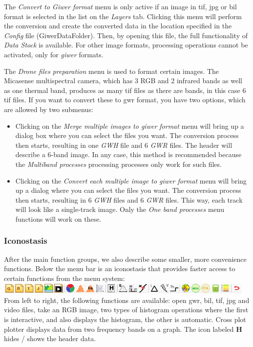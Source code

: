 \documentclass[a4paper,12pt]{article}
\begin{document}
The \textit {Convert to Giwer format} menu is only active if an image in tif, jpg or bil format is selected in the list on the \textit {Layers} tab. Clicking this menu will perform the conversion and create the converted data in the location specified in the \textit {Config} file (GiwerDataFolder). Then, by opening this file, the full functionality of \textit {Data Stock} is available. For other image formats, processing operations cannot be activated, only for \textit {giwer} formats.

The \textit {Drone files preparation} menu is used to format certain images. The Micasense multispectral camera, which has 3 RGB and 2 infrared bands as well as one thermal band, produces as many tif files as there are bands, in this case 6 tif files. If you want to convert these to gwr format, you have two options, which are allowed by two submenus: 

\begin{itemize}
	\item Clicking on the \textit {Merge multiple images to giwer format} menu will bring up a dialog box where you can select the files you want. The conversion process then starts, resulting in one \textit {GWH} file and 6 \textit {GWR} files. The header will describe a 6-band image. In any case, this method is recommended because the \textit {Multiband processes} processing processes only work for such files. 
	
	\item Clicking on the \textit {Convert each multiple image to giwer format} menu will bring up a dialog where you can select the files you want. The conversion process then starts, resulting in 6 \textit {GWH} files and 6 \textit {GWR} files. This way, each track will look like a single-track image. Only the \textit {One band processes} menu functions will work on these. 
\end{itemize}

\subsubsection{Iconostasis }

After the main function groups, we also describe some smaller, more convenience functions. Below the menu bar is an iconostasis that provides faster access to certain functions from the menu system: \\
\includegraphics [height = 0.55cm] {ikonosztaz.png} \\ 
From left to right, the following functions are available: open gwr, bil, tif, jpg and video files, take an RGB image, two types of histogram operations where the first is interactive, and also displays the histogram, the other is automatic. Cross plot plotter displays data from two frequency bands on a graph. The icon labeled \textbf {H} hides / shows the header data.
\end{document}
